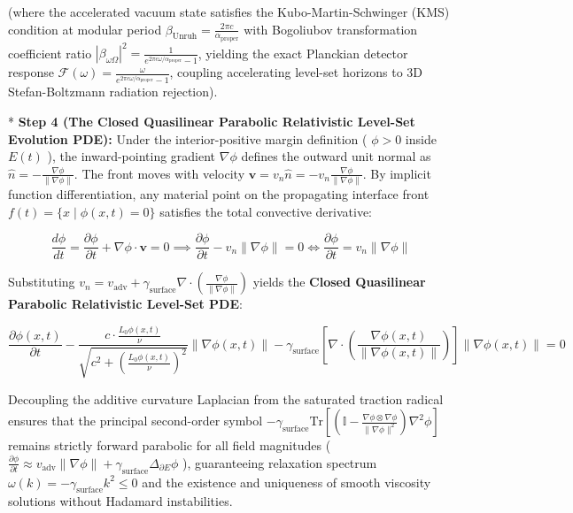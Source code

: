 \documentclass[11pt,a4paper]{article}
\theoremstyle{definition}
\theoremstyle{remark}
\begin{document}
(where the accelerated vacuum state satisfies the Kubo-Martin-Schwinger (KMS) condition at modular period $\beta_{\text{Unruh}} = \frac{2\pi c}{\alpha_{\text{proper}}}$ with Bogoliubov transformation coefficient ratio $|\beta_{\omega\Omega}|^2 = \frac{1}{e^{2\pi c \omega / \alpha_{\text{proper}}} - 1}$, yielding the exact Planckian detector response $\mathcal{F}(\omega) = \frac{\omega}{e^{2\pi c \omega / \alpha_{\text{proper}}} - 1}$, coupling accelerating level-set horizons to 3D Stefan-Boltzmann radiation rejection).

* \textbf{Step 4 (The Closed Quasilinear Parabolic Relativistic Level-Set Evolution PDE):}
Under the interior-positive margin definition ( $\phi > 0$ inside $E(t)$ ), the inward-pointing gradient $\nabla \phi$ defines the outward unit normal as $\hat{n} = -\frac{\nabla \phi}{\|\nabla \phi\|}$. The front moves with velocity $\mathbf{v} = v_n \hat{n} = -v_n \frac{\nabla \phi}{\|\nabla \phi\|}$. By implicit function differentiation, any material point on the propagating interface front $f(t) = \{x \mid \phi(x, t) = 0\}$ satisfies the total convective derivative:


\begin{equation}
\frac{d\phi}{dt} = \frac{\partial \phi}{\partial t} + \nabla \phi \cdot \mathbf{v} = 0 \implies \frac{\partial \phi}{\partial t} - v_n \|\nabla \phi\| = 0 \iff \frac{\partial \phi}{\partial t} = v_n \|\nabla \phi\|
\end{equation}


Substituting $v_n = v_{\text{adv}} + \gamma_{\text{surface}}\nabla \cdot \left(\frac{\nabla \phi}{\|\nabla \phi\|}\right)$ yields the \textbf{Closed Quasilinear Parabolic Relativistic Level-Set PDE}:


\begin{equation}
\boxed{\frac{\partial \phi(x, t)}{\partial t} - \frac{c \cdot \frac{L_0 \phi(x, t)}{\nu}}{\sqrt{c^2 + \left(\frac{L_0 \phi(x, t)}{\nu}\right)^2}} \|\nabla \phi(x, t)\| - \gamma_{\text{surface}} [ \nabla \cdot \left( \frac{\nabla \phi(x, t)}{\|\nabla \phi(x, t)\|} \right) ] \|\nabla \phi(x, t)\| = 0}
\end{equation}


Decoupling the additive curvature Laplacian from the saturated traction radical ensures that the principal second-order symbol $-\gamma_{\text{surface}} \mathrm{Tr}[ \left(\mathbb{I} - \frac{\nabla \phi \otimes \nabla \phi}{\|\nabla \phi\|^2}\right) \nabla^2 \phi ]$ remains strictly forward parabolic for all field magnitudes ( $\frac{\partial \phi}{\partial t} \approx v_{\text{adv}}\|\nabla \phi\| + \gamma_{\text{surface}}\Delta_{\partial E}\phi$ ), guaranteeing relaxation spectrum $\omega(k) = -\gamma_{\text{surface}}k^2 \le 0$ and the existence and uniqueness of smooth viscosity solutions without Hadamard instabilities.
\end{document}
